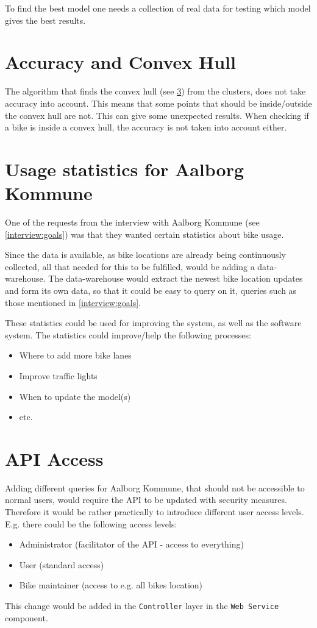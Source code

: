 To find the best model one needs a collection of real data for testing which model gives the best results.


\section{Accuracy and Convex Hull}
The algorithm that finds the convex hull (see  \cref{}) from the clusters, does not take accuracy into account.
This means that some points that should be inside/outside the convex hull are not.
This can give some unexpected results.
When checking if a bike is inside a convex hull, the accuracy is not taken into account either.

\section{Usage statistics for Aalborg Kommune}
One of the requests from the interview with Aalborg Kommune (see \cref{interview:goals}) was that they wanted certain statistics about bike usage.

Since the data is available, as bike locations are already being continuously collected, all that needed for this to be fulfilled, would be adding a data-warehouse.
The data-warehouse would extract the newest bike location updates and form its own data, so that it could be easy to query on it, queries such as those mentioned in \cref{interview:goals}.

These statistics could be used for improving the \citybike system, as well as the software system.
The statistics could improve/help the following processes:
\begin{itemize}
\item Where to add more bike lanes
\item Improve traffic lights 
\item When to update the model(s)
\item etc.
\end{itemize}

\section{API Access}
Adding different queries for Aalborg Kommune, that should not be accessible to normal users, would require the API to be updated with security measures.
Therefore it would be rather practically to introduce different user access levels.
E.g. there could be the following access levels:
\begin{itemize}
\item Administrator (facilitator of the API - access to everything)
\item User (standard access)
\item Bike maintainer (access to e.g. all bikes location)
\end{itemize}
This change would be added in the \texttt{Controller} layer in the \texttt{Web Service} component.

